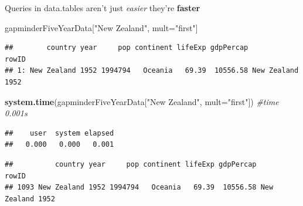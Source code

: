 \documentclass[]{article}
\newenvironment{Shaded}{\begin{snugshade}}{\end{snugshade}}
\newcommand{\KeywordTok}[1]{\textcolor[rgb]{0.13,0.29,0.53}{\textbf{{#1}}}}
\newcommand{\DataTypeTok}[1]{\textcolor[rgb]{0.13,0.29,0.53}{{#1}}}
\newcommand{\DecValTok}[1]{\textcolor[rgb]{0.00,0.00,0.81}{{#1}}}
\newcommand{\StringTok}[1]{\textcolor[rgb]{0.31,0.60,0.02}{{#1}}}
\newcommand{\CommentTok}[1]{\textcolor[rgb]{0.56,0.35,0.01}{\textit{{#1}}}}
\newcommand{\NormalTok}[1]{{#1}}
\begin{document}
Queries in data.tables aren't just \emph{easier} they're \textbf{faster}

\begin{Shaded}
\begin{Highlighting}[]
\NormalTok{gapminderFiveYearData[}\StringTok{"New Zealand"}\NormalTok{, mult=}\StringTok{"first"}\NormalTok{] }
\end{Highlighting}
\end{Shaded}

\begin{verbatim}
##        country year     pop continent lifeExp gdpPercap            rowID
## 1: New Zealand 1952 1994794   Oceania   69.39  10556.58 New Zealand 1952
\end{verbatim}

\begin{Shaded}
\begin{Highlighting}[]
\KeywordTok{system.time}\NormalTok{(gapminderFiveYearData[}\StringTok{"New Zealand"}\NormalTok{, }\DataTypeTok{mult=}\StringTok{"first"}\NormalTok{]) }\CommentTok{#time 0.001s}
\end{Highlighting}
\end{Shaded}

\begin{verbatim}
##    user  system elapsed 
##   0.000   0.000   0.001
\end{verbatim}

\begin{Shaded}
\end{Shaded}

\begin{verbatim}
##          country year     pop continent lifeExp gdpPercap            rowID
## 1093 New Zealand 1952 1994794   Oceania   69.39  10556.58 New Zealand 1952
\end{verbatim}

\begin{Shaded}
\end{Shaded}
\end{document}
